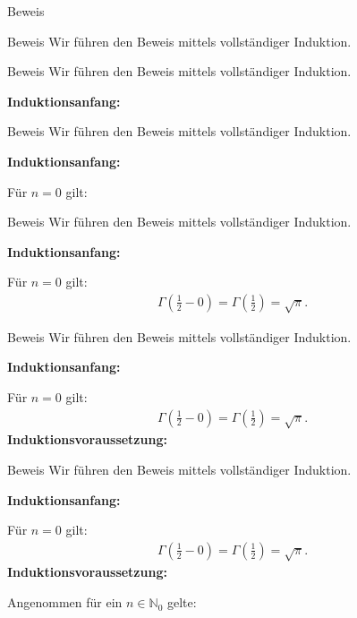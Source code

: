 \documentclass[10pt]{beamer}
\def\bN{\mathbb{N}}
\begin{document}
\begin{frame}{Beweis}
 
\end{frame}



\begin{frame}{Beweis}
    Wir führen den Beweis mittels vollständiger Induktion. 
\end{frame}



\begin{frame}{Beweis}
    Wir führen den Beweis mittels vollständiger Induktion.

    \textbf{Induktionsanfang:}
\end{frame}



\begin{frame}{Beweis}
    Wir führen den Beweis mittels vollständiger Induktion.

    \textbf{Induktionsanfang:}

    Für \( n = 0 \) gilt:
\end{frame}



\begin{frame}{Beweis}
    Wir führen den Beweis mittels vollständiger Induktion.

    \textbf{Induktionsanfang:}
    
    Für \( n = 0 \) gilt:
    \begin{align*}
        \Gamma\left( \frac{1}{2} - 0 \right)
        = \Gamma\left( \frac{1}{2} \right) 
        = \sqrt{\pi}.
    \end{align*}
\end{frame}



\begin{frame}{Beweis}
    Wir führen den Beweis mittels vollständiger Induktion.

    \textbf{Induktionsanfang:}
    
    Für \( n = 0 \) gilt:
    \begin{align*}
        \Gamma\left( \frac{1}{2} - 0 \right)
        = \Gamma\left( \frac{1}{2} \right) 
        = \sqrt{\pi}.
    \end{align*}
    \textbf{Induktionsvoraussetzung:}
\end{frame}



\begin{frame}{Beweis}
    Wir führen den Beweis mittels vollständiger Induktion.

    \textbf{Induktionsanfang:}
    
    Für \( n = 0 \) gilt:
    \begin{align*}
        \Gamma\left( \frac{1}{2} - 0 \right)
        = \Gamma\left( \frac{1}{2} \right) 
        = \sqrt{\pi}.
    \end{align*}
    \textbf{Induktionsvoraussetzung:}

    Angenommen für ein \( n \in \bN_{0} \) gelte:
\end{frame}
\end{document}
